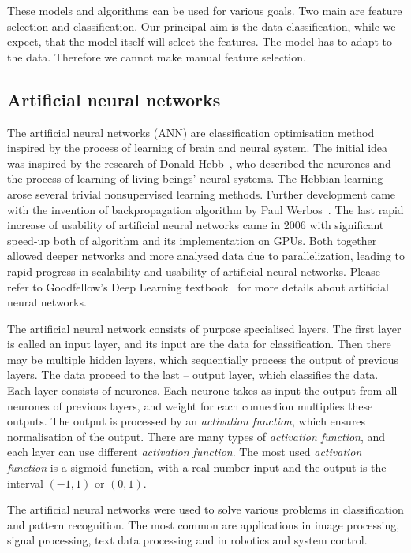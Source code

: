 \documentclass[
    digital,    %
    oneside,    %
    color,
    11pt,
    nocover,
    notable,
    nolof,
    nolot,
]{fithesis3}
\begin{document}
These models and algorithms can be used for various goals. Two main are feature selection and classification. Our principal aim is the data classification, while we expect, that the model itself will select the features. The model has to adapt to the data. Therefore we cannot make manual feature selection.

\subsection{Artificial neural networks}
\label{subsec:opt-other-ann}

The artificial neural networks (ANN) are classification optimisation method inspired by the process of learning of brain and neural system. The initial idea was inspired by the research of Donald Hebb~\cite{hebb49learning}, who described the neurones and the process of learning of living beings' neural systems. The Hebbian learning arose several trivial nonsupervised learning methods. Further development came with the invention of backpropagation algorithm by Paul Werbos~\cite{werbos75beyondThesis}. The last rapid increase of usability of artificial neural networks came in 2006 with significant speed-up both of algorithm and its implementation on GPUs. Both together allowed deeper networks and more analysed data due to parallelization, leading to rapid progress in scalability and usability of artificial neural networks. Please refer to Goodfellow's Deep Learning textbook~\cite{Goodfellow-et-al-2016} for more details about artificial neural networks.

The artificial neural network consists of purpose specialised layers. The first layer is called an input layer, and its input are the data for classification. Then there may be multiple hidden layers, which sequentially process the output of previous layers. The data proceed to the last -- output layer, which classifies the data. Each layer consists of neurones. Each neurone takes as input the output from all neurones of previous layers, and weight for each connection multiplies these outputs. The output is processed by an \textit{activation function}, which ensures normalisation of the output. There are many types of \textit{activation function}, and each layer can use different \textit{activation function}. The most used \textit{activation function} is a sigmoid function, with a real number input and the output is the interval $(-1, 1)$ or $(0, 1)$.

The artificial neural networks were used to solve various problems in classification and pattern recognition. The most common are applications in image processing, signal processing, text data processing and in robotics and system control.
\end{document}
